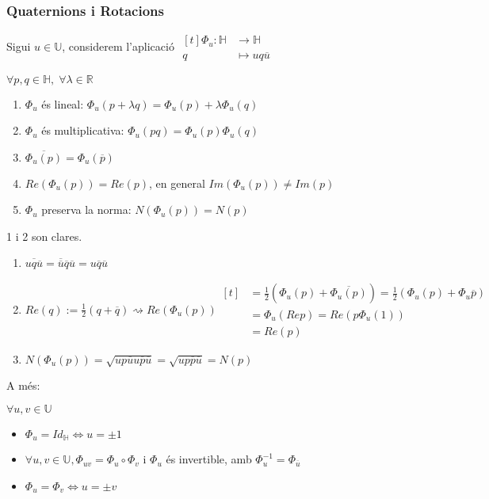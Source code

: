 \documentclass[../main.tex]{subfiles}
\begin{document}
	\subsubsection{Quaternions i Rotacions}
	Sigui $u \in \mathbb{U}$, considerem l'aplicació $\begin{aligned}[t]\Phi_u: \mathbb{H} &\to \mathbb{H}\\q &\mapsto uq\overline{u}\end{aligned}$
	\begin{proposicio}
		$\forall p, q \in \mathbb{H},\;\forall \lambda \in \mathbb{R}$
		\begin{enumerate}
			\item $\Phi_u$ és lineal: $\Phi_u(p + \lambda q) = \Phi_u(p) + \lambda\Phi_u(q)$
			\item $\Phi_u$ és multiplicativa: $\Phi_u(pq) = \Phi_u(p)\Phi_u(q)$
			\item $\overline{\Phi_u(p)} = \Phi_u(\overline{p})$
			\item $Re(\Phi_u(p)) = Re(p)$, en general $Im(\Phi_u(p)) \neq Im(p)$
			\item $\Phi_u$ preserva la norma: $N(\Phi_u(p)) = N(p)$
		\end{enumerate}
	\end{proposicio}
	\begin{demostracio}
		1 i 2 son clares.
		\begin{enumerate}\addtocounter{enumi}{2}
			\item $\overline{uq\overline{u}} = \overline{\overline{u}}\overline{q}\overline{u} = u\overline{q}\overline{u}$
			\item $Re(q) := \frac{1}{2}(q + \overline{q}) \rightsquigarrow Re(\Phi_u(p)) \begin{aligned}[t]
				&= \frac{1}{2}(\Phi_u(p) + \overline{\Phi_u(p)}) =  \frac{1}{2}(\Phi_u(p) + \Phi_u{\overline{p}})\\
				&= \Phi_u(Re p) = Re(p \Phi_u(1))\\
				&= Re(p)
			\end{aligned}$
			\item $N(\Phi_u(p)) = \sqrt{up\overline{u}u\overline{p}\overline{u}} = \sqrt{up\overline{p}\overline{u}} = N(p)$
		\end{enumerate}
	\end{demostracio}
	A més:
	\begin{proposicio} $\forall u,v \in \mathbb{U}$
		\begin{itemize}
			\item $\Phi_u = Id_\mathbb{H} \iff u = \pm 1$
			\item $\forall u, v \in \mathbb{U}, \Phi_{uv} = \Phi_u \circ \Phi_v$ i $\Phi_u$ és invertible, amb $\Phi_u^{-1} = \Phi_{\overline{u}}$
			\item $\Phi_u = \Phi_v \iff u = \pm v$
		\end{itemize}
	\end{proposicio}
\end{document}
